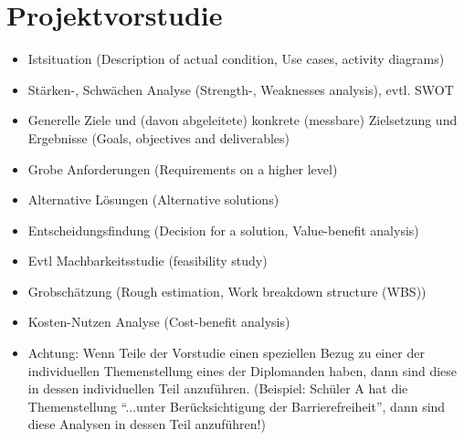 \chapter{Projektvorstudie}

\begin{itemize}
\item Istsituation (Description of actual condition, Use cases, activity diagrams)
\item Stärken-, Schwächen Analyse (Strength-, Weaknesses analysis), evtl. SWOT
\item Generelle Ziele und (davon abgeleitete) konkrete (messbare) Zielsetzung und Ergebnisse (Goals, objectives and deliverables)
\item Grobe Anforderungen (Requirements on a higher level)
\item Alternative Lösungen (Alternative solutions)
\item Entscheidungsfindung (Decision for a solution, Value-benefit analysis)
\item Evtl Machbarkeitsstudie (feasibility study)
\item Grobschätzung (Rough estimation, Work breakdown structure (WBS))
\item Kosten-Nutzen Analyse (Cost-benefit analysis)
\item Achtung: Wenn Teile der Vorstudie einen speziellen Bezug zu einer der individuellen Themenstellung eines der Diplomanden haben, dann sind diese in dessen individuellen Teil anzuführen. (Beispiel: Schüler A hat die Themenstellung “...unter Berücksichtigung der Barrierefreiheit”, dann sind diese Analysen in dessen Teil anzuführen!)

\end{itemize}
